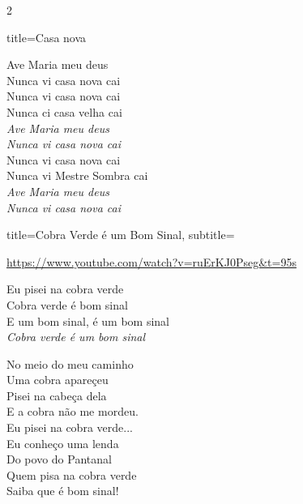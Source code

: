 \documentclass[fontsize=14pt, paper=a4, twoside, DIV=20]{scrreprt} %
\begin{document}
\begin{multicols*}{2}
\begin{song}{title={Casa nova}}
        \begin{verse*}
            Ave Maria meu deus\\
            Nunca vi casa nova cai\\
            Nunca vi casa nova cai\\
            Nunca ci casa velha cai\\
            \textit{Ave Maria meu deus}\\
            \textit{Nunca vi casa nova cai}\\
            Nunca vi casa nova cai\\
            Nunca vi Mestre Sombra cai\\
            \textit{Ave Maria meu deus}\\
            \textit{Nunca vi casa nova cai}\\
        \end{verse*}
\end{song}

\begin{song}{title={Cobra Verde é um Bom Sinal}, subtitle={\begin{small}
            \url{https://www.youtube.com/watch?v=ruErKJ0Pseg&t=95s}
\end{small}}}
    \begin{chorus*}
            Eu pisei na cobra verde\\
            Cobra verde é bom sinal\\
            E um bom sinal, é um bom sinal\\
            \textit{Cobra verde é um bom sinal}\\
    \end{chorus*}
        \begin{verse*}
        No meio do meu caminho\\
        Uma cobra apareçeu\\
        Pisei na cabeça dela\\
        E a cobra não me mordeu.\\
        Eu pisei na cobra verde...\\

        Eu conheço uma lenda\\
        Do povo do Pantanal\\
        Quem pisa na cobra verde\\
        Saiba que é bom sinal!\\


\end{verse*}
\end{song}
\end{multicols*}
\end{document}
